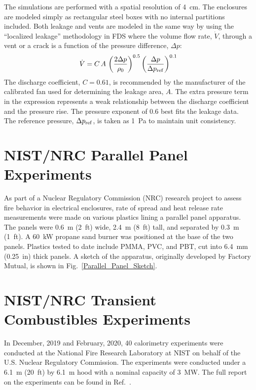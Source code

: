 The simulations are performed with a spatial resolution of 4~cm. The enclosures are modeled simply as rectangular steel boxes with no internal partitions included. Both leakage and vents are modeled in the same way by using the ``localized leakage'' methodology in FDS where the volume flow rate, $\dot{V}$, through a vent or a crack is a function of the pressure difference, $\Delta p$:
\begin{equation}
    \dot{V} = C \, A \, \left( \frac{2 \Delta p}{\rho_0} \right)^{0.5} \left( \frac{\Delta p}{\Delta p_{\rm ref}} \right)^{0.1} \label{leak_eq}
\end{equation}
The discharge coefficient, $C=0.61$, is recommended by the manufacturer of the calibrated fan used for determining the leakage area, $A$. The extra pressure term in the expression represents a weak relationship between the discharge coefficient and the pressure rise. The pressure exponent of 0.6 best fits the leakage data. The reference pressure, $\Delta p_{\rm ref}$, is taken as 1~Pa to maintain unit consistency.


\FloatBarrier

\section{NIST/NRC Parallel Panel Experiments}
\label{NIST_NRC_Parallel_Panels_Description}

As part of a Nuclear Regulatory Commission (NRC) research project to assess fire behavior in electrical enclosures, rate of spread and heat release rate measurements were made on various plastics lining a parallel panel apparatus. The panels were 0.6~m (2~ft) wide, 2.4~m (8~ft) tall, and separated by 0.3~m (1~ft). A 60~kW propane sand burner was positioned at the base of the two panels. Plastics tested to date include PMMA, PVC, and PBT, cut into 6.4~mm (0.25~in) thick panels. A sketch of the apparatus, originally developed by Factory Mutual, is shown in Fig.~\ref{Parallel_Panel_Sketch}.


\section{NIST/NRC Transient Combustibles Experiments}
\label{NIST_NRC_Transient_Combustibles_Description}

In December, 2019 and February, 2020, 40 calorimetry experiments were conducted at the National Fire Research Laboratory at NIST on behalf of the U.S. Nuclear Regulatory Commission. The experiments were conducted under a 6.1~m (20~ft) by 6.1~m hood with a nominal capacity of 3~MW. The full report on the experiments can be found in Ref.~\cite{McGrattan:Multiple_Transients_2020}.

